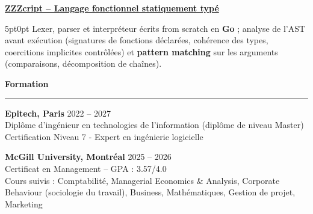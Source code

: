\documentclass[9pt]{extarticle}
\begin{document}
\underline{\bfseries \href{https://github.com/paulogarithm/zzzcript}{ZZZcript} -- Langage fonctionnel statiquement typé}
\par
\begin{adjustwidth}{5pt}{0pt}
    Lexer, parser et interpréteur écrits from scratch en {\bfseries Go} ; analyse de l'AST avant exécution (signatures de fonctions déclarées, cohérence des types, coercitions implicites contrôlées) et {\bfseries pattern matching} sur les arguments (comparaisons, décomposition de chaînes).
\end{adjustwidth}

\par\vspace{8pt}


{\large\bfseries Formation}
\par\vspace{-8pt}
\rule{\linewidth}{0.4pt}
\par\vspace{5pt}

{\bfseries Epitech, Paris} \hfill 2022 -- 2027 \\
Diplôme d'ingénieur en technologies de l'information (diplôme de niveau Master) \\
Certification Niveau 7 - Expert en ingénierie logicielle

\vspace{6pt}

{\bfseries McGill University, Montréal} \hfill 2025 -- 2026 \\
Certificat en Management -- GPA : 3.57/4.0 \\
Cours suivis : Comptabilité, Managerial Economics \& Analysis, Corporate Behaviour (sociologie du travail), Business, Mathématiques, Gestion de projet, Marketing
\end{document}
